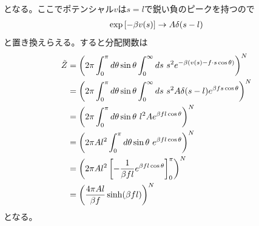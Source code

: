 \documentclass{jsarticle}  %
\numberwithin{equation}{section} %
\numberwithin{figure}{section}
\begin{document}
    となる。ここでポテンシャル$v$は$s=l$で鋭い負のピークを持つので
    \begin{align}
        \exp \left[ -\beta v(s) \right] \rightarrow A\delta (s - l) \notag 
    \end{align}
    と置き換えらえる。すると分配関数は
    \begin{align}
        \tilde{Z} &= \left( 2\pi \int_0^{\pi} d\theta \sin \theta \int_0^{\infty} ds\ s^2e^{-\beta \left( v(s) - f \cdot s\cos \theta \right)} \right)^N \notag \\
        &= \left( 2\pi \int_0^{\pi} d\theta \sin \theta \int_0^{\infty} ds\ s^2 A\delta (s - l) e^{\beta f  s\cos \theta} \right)^N \notag \\
        &= \left( 2\pi \int_0^{\pi} d\theta \sin \theta\ l^2 A e^{\beta f  l\cos \theta} \right)^N \notag \\
        &= \left( 2\pi A l^2 \int_0^{\pi} d\theta \sin \theta\ e^{\beta f  l\cos \theta} \right)^N \notag \\
        &= \left( 2\pi A l^2 \left[  -\frac{1}{\beta f l}e^{\beta f  l\cos \theta} \right]_0^{\pi} \right)^N \notag \\
        &= \left(  \frac{4\pi A l}{\beta f} \sinh (\beta f l) \right)^N 
    \end{align}
    となる。
\end{document}
